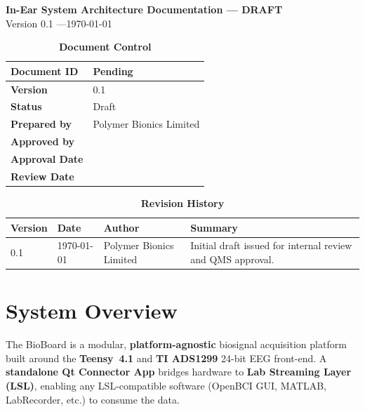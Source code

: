 \documentclass[11pt,a4paper]{article}
\begin{document}
\begin{center}
    {\LARGE\bfseries In-Ear System Architecture Documentation --- DRAFT} \\[0.5em]
    {\small Version 0.1 \quad---\quad \today}
\end{center}

\vspace{1em}
\begin{table}[H]
\centering
\caption*{\large\bfseries\color{hwcolor}Document Control}
\begin{tabularx}{0.9\textwidth}{|>{\bfseries}l|X|}
\hline
Document ID & Pending \\
 \hline
Version & 0.1 \\
 \hline
Status & Draft \\
 \hline
Prepared by & Polymer Bionics Limited \\
 \hline
Approved by & \\
 \hline
Approval Date & \\
 \hline
Review Date & \\
\hline
\end{tabularx}
\end{table}

\vspace{0.8em}
\begin{table}[H]
\centering
\caption*{\large\bfseries\color{hwcolor}Revision History}
\begin{tabularx}{0.9\textwidth}{|l|l|l|X|}
\hline
\textbf{Version} & \textbf{Date} & \textbf{Author} & \textbf{Summary} \\
\hline
0.1 & \today & Polymer Bionics Limited & Initial draft issued for internal review and QMS approval. \\
\hline
\end{tabularx}
\end{table}

\newpage
\tableofcontents
\vspace{1.5em}
\newpage

\section{System Overview}

The BioBoard is a modular, \textbf{platform-agnostic} biosignal acquisition
platform built around the \textbf{Teensy~4.1} and \textbf{TI ADS1299}
24-bit EEG front-end.  A \textbf{standalone Qt Connector App} bridges
hardware to \textbf{Lab Streaming Layer (LSL)}, enabling any LSL-compatible
software (OpenBCI GUI, MATLAB, LabRecorder, etc.)
to consume the data.
\end{document}

